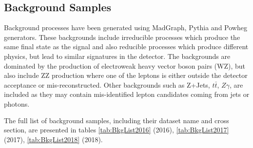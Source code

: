 \subsection{Background Samples}

Background processes have been generated using MadGraph, Pythia and Powheg
generators. These backgrounds include irreducible processes which produce the
same final state as the signal and also reducible processes which produce
different physics, but lead to similar signatures in the detector. The backgrounds
are dominated by the production of electroweak heavy vector boson pairs (WZ), but
also include ZZ production where one of the leptons is either outside the detector
acceptance or mis-reconstructed. Other backgrounds such as Z+Jets, $t\bar{t}$,
$Z\gamma$, are included as they may contain mis-identified lepton candidates
coming from jets or photons.

The full list of background samples, including their dataset name and cross
section, are presented in tables \ref{tab:BkgList2016} (2016),
\ref{tab:BkgList2017}(2017), \ref{tab:BkgList2018} (2018).

